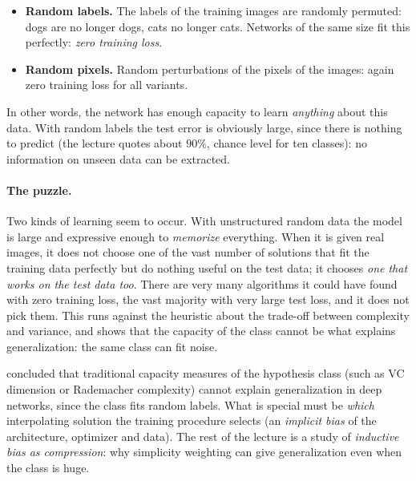 \begin{exmp}
\begin{itemize}
  \item \textbf{Random labels.} The labels of the training images are randomly permuted: dogs are no longer dogs, cats no longer cats. Networks of the same size fit this perfectly: \emph{zero training loss}.
  \item \textbf{Random pixels.} Random perturbations of the pixels of the images: again zero training loss for all variants.
\end{itemize}
In other words, the network has enough capacity to learn \emph{anything} about this data. With random labels the test error is obviously large, since there is nothing to predict (the lecture quotes about $90\%$, chance level for ten classes): no information on unseen data can be extracted.
\end{exmp}

\paragraph{The puzzle.} Two kinds of learning seem to occur. With unstructured random data the model is large and expressive enough to \emph{memorize} everything. When it is given real images, it does not choose one of the vast number of solutions that fit the training data perfectly but do nothing useful on the test data;
it chooses \emph{one that works on the test data too}. There are very many algorithms it could have found with zero training loss, the vast majority with very large test loss, and it does not pick them.
This runs against the heuristic about the trade-off between complexity and variance, and shows that the capacity of the class cannot be what explains generalization: the same class can fit noise.

\begin{beyond}
\citet{zhang2017} concluded that traditional capacity measures of the hypothesis class (such as VC dimension or Rademacher complexity) cannot explain generalization in deep networks, since the class fits random labels. What is special must be \emph{which} interpolating solution the training procedure selects (an \emph{implicit bias} of the architecture, optimizer and data). The rest of the lecture is a study of \emph{inductive bias as compression}: why simplicity weighting can give generalization even when the class is huge.
\end{beyond}

